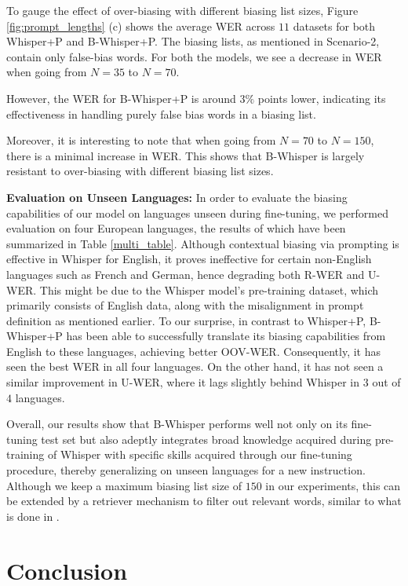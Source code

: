\documentclass{article}
\begin{document}
To gauge the effect of over-biasing with different biasing list sizes, Figure \ref{fig:prompt_lengths} (c) shows the average WER across $11$ datasets for both Whisper+P and B-Whisper+P. The biasing lists, as mentioned in Scenario-2, contain only false-bias words. For both the models, we see a decrease in WER when going from $N=35$ to $N=70$. 

However, the WER for B-Whisper+P is around $3\%$ points lower, indicating its effectiveness in handling purely false bias words in a biasing list.

Moreover, it is interesting to note that when going from $N=70$ to $N=150$, there is a minimal increase in WER. This shows that B-Whisper is largely resistant to over-biasing with different biasing list sizes.

\textbf{Evaluation on Unseen Languages: } In order to evaluate the biasing capabilities of our model on languages unseen during fine-tuning, we performed evaluation on four European languages, the results of which have been summarized in Table \ref{multi_table}. Although contextual biasing via prompting is effective in Whisper for English, it proves ineffective for certain non-English languages such as French and German, hence degrading both R-WER and U-WER. This might be due to the Whisper model's pre-training dataset, which primarily consists of English data, along with the misalignment in prompt definition as mentioned earlier. To our surprise, in contrast to Whisper+P, B-Whisper+P has been able to successfully translate its biasing capabilities from English to these languages, achieving better OOV-WER. Consequently, it has seen the best WER in all four languages. On the other hand, it has not seen a similar improvement in U-WER, where it lags slightly behind Whisper in $3$ out of $4$ languages. 

Overall, our results show that B-Whisper performs well not only on its fine-tuning test set but also adeptly integrates broad knowledge acquired during pre-training of Whisper with specific skills acquired through our fine-tuning procedure, thereby generalizing on unseen languages for a new instruction. Although we keep a maximum biasing list size of $150$ in our experiments, this can be extended by a retriever mechanism to filter out relevant words, similar to what is done in \cite{saket}.

\section{Conclusion}
\end{document}
